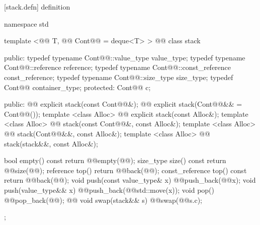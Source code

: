 \documentclass[american,twoside]{book}
\begin{document}
[stack.defn]{ definition}

\begin{codeblock}
namespace std {
  template <@@ T, @@ Cont@@ = deque<T> >
  @@
  class stack {
  public:
    typedef typename Cont@@::value_type            value_type;
    typedef typename Cont@@::reference             reference;
    typedef typename Cont@@::const_reference       const_reference;
    typedef typename Cont@@::size_type             size_type;
    typedef          Cont@@                        container_type;
  protected:
    Cont@@ c;

  public:
    @@ explicit stack(const Cont@@&);
    @@ explicit stack(Cont@@&& = Cont@@());
    template <class Alloc> 
      @@
      explicit stack(const Alloc&);
    template <class Alloc> 
      @@
      stack(const Cont@@&, const Alloc&);
    template <class Alloc> 
      @@
      stack(Cont@@&&, const Alloc&);
    template <class Alloc> 
      @@
      stack(stack&&, const Alloc&);

    bool      empty() const             { return @@empty(@@); }
    size_type size()  const             { return @@size(@@); }
    reference         top()             { return @@back(@@); }
    const_reference   top() const       { return @@back(@@); }
    void push(const value_type& x)      { @@push_back(@@x); }
    void push(value_type&& x)           { @@push_back(@@std::move(x)); }
    void pop()                          { @@pop_back(@@); }
    @@
      void swap(stack&& s)              { @@swap(@@s.c); }
  };

}
\end{codeblock}
\end{document}

